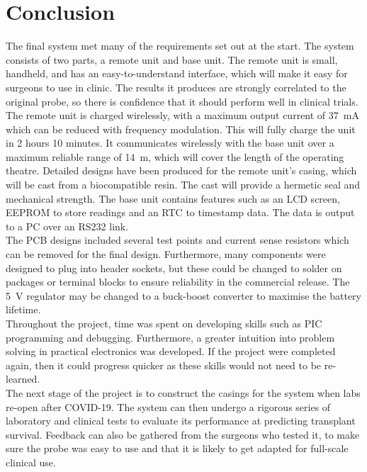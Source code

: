 \section{Conclusion}
The final system met many of the requirements set out at the start. The system consists of two parts, a remote unit and base unit. The remote unit is small, handheld, and has an easy-to-understand interface, which will make it easy for surgeons to use in clinic. The results it produces are strongly correlated to the original probe, so there is confidence that it should perform well in clinical trials. The remote unit is charged wirelessly, with a maximum output current of \SI{37}{\milli\ampere} which can be reduced with frequency modulation. This will fully charge the unit in 2 hours 10 minutes. It communicates wirelessly with the base unit over a maximum reliable range of \SI{14}{\metre}, which will cover the length of the operating theatre. Detailed designs have been produced for the remote unit's casing, which will be cast from a biocompatible resin. The cast will provide a hermetic seal and mechanical strength. The base unit contains features such as an LCD screen, EEPROM to store readings and an RTC to timestamp data. The data is output to a PC over an RS232 link.\\

The PCB designs included several test points and current sense resistors which can be removed for the final design. Furthermore, many components were designed to plug into header sockets, but these could be changed to solder on packages or terminal blocks to ensure reliability in the commercial release. The \SI{5}{\volt} regulator may be changed to a buck-boost converter to maximise the battery lifetime. \\

Throughout the project, time was spent on developing skills such as PIC programming and debugging. Furthermore, a greater intuition into problem solving in practical electronics was developed. If the project were completed again, then it could progress quicker as these skills would not need to be re-learned. \\

The next stage of the project is to construct the casings for the system when labs re-open after COVID-19. The system can then undergo a rigorous series of laboratory and clinical tests to evaluate its performance at predicting transplant survival. Feedback can also be gathered from the surgeons who tested it, to make sure the probe was easy to use and that it is likely to get adapted for full-scale clinical use.